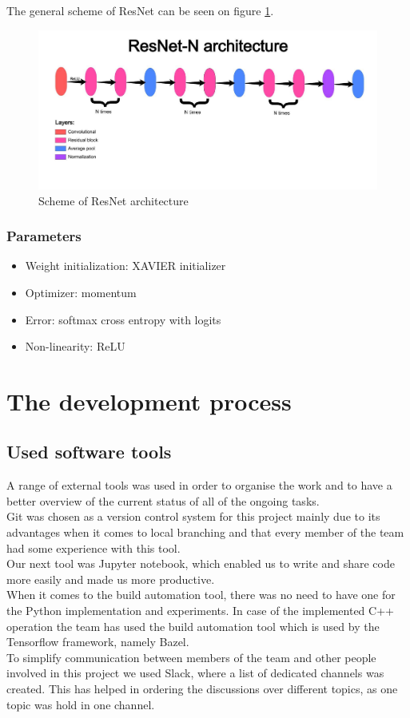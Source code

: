 \documentclass[licencjacka]{pracamgr}
\begin{document}
		The general scheme of ResNet can be seen on figure \ref{fig:666}.
		\begin{figure}[h]
		\caption{Scheme of ResNet architecture}
		\label{fig:666}
				\centering
				\includegraphics[width=\textwidth]{images/resnet}
		\end{figure}
		\subsection{Parameters}
			\begin{itemize}
 			\item Weight initialization: XAVIER initializer
 			\item Optimizer: momentum 
 			\item Error: softmax cross entropy with logits
 			\item Non-linearity: ReLU
			\end{itemize}

\chapter{The development process}

	\section{Used software tools}
	A range of external tools was used in order to organise the work and to have a better overview of the current status of all of the ongoing tasks.
\\
	Git was chosen as a version control system for this project mainly due to its advantages when it comes to local branching and that every member of the team had some experience with this tool.
\\
	Our next tool was Jupyter notebook, which enabled us to write and share code more easily and made us more productive. 
\\
	When it comes to the build automation tool, there was no need to have one for the Python implementation and experiments. In case of the implemented C++ operation the team has used the build automation tool which is used by the Tensorflow framework, namely Bazel.	
\\
	To simplify communication between members of the team and other people involved in this project we used Slack, where a list of dedicated channels was created. This has helped in ordering the discussions over different topics, as one topic was hold in one channel.
\end{document}
